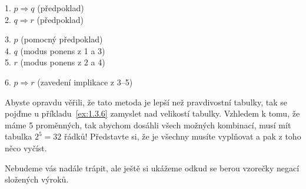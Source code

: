 
\begin{solution}
  \begin{proofbox}
    1. $p \Rightarrow q$ (předpoklad) \\
    2. $q \Rightarrow r$ (předpoklad) 
  \begin{proofbox}
    3. $p$ (pomocný předpoklad) \\
    4. $q$ (modus ponens z 1 a 3) \\
    5. $r$ (modus ponens z 2 a 4)
  \end{proofbox}
    6. $p \Rightarrow r$ (zavedení implikace z 3--5)
  \end{proofbox}
\end{solution}

\begin{definitionbox}
  Abyste opravdu věřili, že tato metoda je lepší než pravdivostní tabulky, tak se pojďme u příkladu~\ref{ex:1.3.6} zamyslet nad velikostí tabulky. Vzhledem k tomu, že máme 5 proměnných, tak abychom dosáhli všech možných kombinací, musí mít tabulka $2^5 = 32$ řádků! Představte si, že je všechny musíte vyplňovat a pak z toho něco vyčíst. 
\end{definitionbox}

Nebudeme vás nadále trápit, ale ještě si ukážeme odkud se berou vzorečky negací složených výroků.

